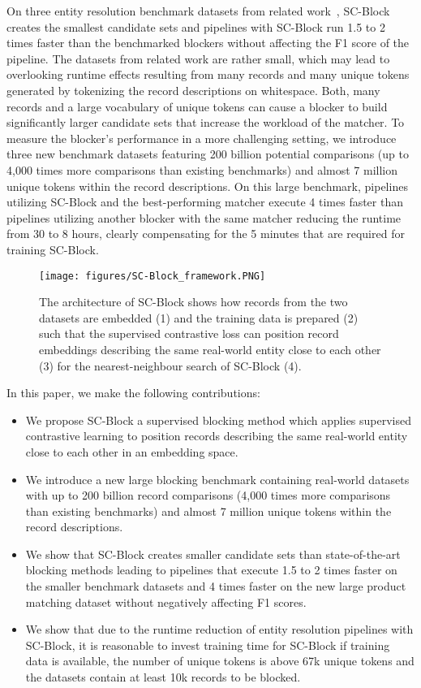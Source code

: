 \documentclass[sigconf,nonacm]{acmart}
\begin{document}
On three entity resolution benchmark datasets from related work~\cite{konda_magellan_2016,li_deep_2020, thirumuruganathan_deep_2021, wang_sudowoodo_2022}, SC-Block creates the smallest candidate sets and pipelines with SC-Block run 1.5 to 2 times faster than the benchmarked blockers without affecting the F1 score of the pipeline.
The datasets from related work are rather small, which may lead to overlooking runtime effects resulting from many records and many unique tokens generated by tokenizing the record descriptions on whitespace.
Both, many records and a large vocabulary of unique tokens can cause a blocker to build significantly larger candidate sets that increase the workload of the matcher.
To measure the blocker's performance in a more challenging setting, we introduce three new benchmark datasets featuring 200 billion potential comparisons (up to 4,000 times more comparisons than existing benchmarks) and almost 7 million unique tokens within the record descriptions.
On this large benchmark, pipelines utilizing SC-Block and the best-performing matcher execute 4 times faster than pipelines utilizing another blocker with the same matcher reducing the runtime from 30 to 8 hours, clearly compensating for the 5 minutes that are required for training SC-Block. 


\begin{figure*}[t]
\texttt{[image: figures/SC-Block\_framework.PNG]}
\caption{The architecture of SC-Block shows how records from the two datasets are embedded (1) and the training data is prepared (2) such that the supervised contrastive loss can position record embeddings describing the same real-world entity close to each other (3) for the nearest-neighbour search of SC-Block (4).}
\label{fig:sc_block_architecture}
\end{figure*}

In this paper, we make the following contributions:
\begin{itemize}
  \item  We propose SC-Block a supervised blocking method which applies supervised contrastive learning to position records describing the same real-world entity close to each other in an embedding space.
  \item We introduce a new large blocking benchmark containing real-world datasets with up to 200 billion record comparisons (4,000 times more comparisons than existing benchmarks) and almost 7 million unique tokens within the record descriptions.
\item We show that SC-Block creates smaller candidate sets than state-of-the-art blocking methods leading to pipelines that execute 1.5 to 2 times faster on the smaller benchmark datasets and 4 times faster on the new large product matching dataset without negatively affecting F1 scores.
 \item We show that due to the runtime reduction of entity resolution pipelines with SC-Block, it is reasonable to invest training time for SC-Block if training data is available, the number of unique tokens is above 67k unique tokens and the datasets contain at least 10k records to be blocked.
\end{itemize}
\end{document}
